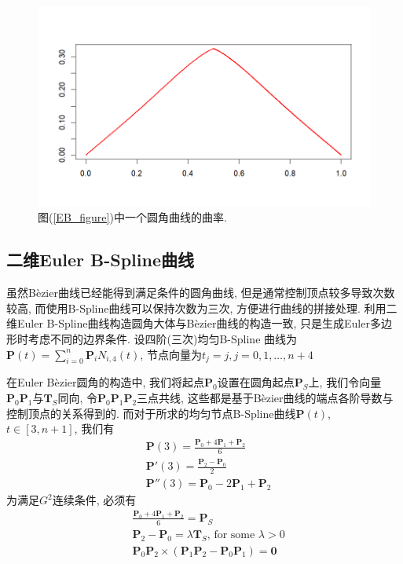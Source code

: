 \documentclass[utf8]{ctexart} %
\begin{document}
	 \begin{figure}[htbp]
	 	\centering
	 	\includegraphics[width=0.7\linewidth]{figures/SixEdges_EulerBezier.png}
	 	\caption{图(\ref{EB_figure})中一个圆角曲线的曲率. }
	 \end{figure}
	 \subsection{二维Euler B-Spline曲线}
	 虽然B\`ezier曲线已经能得到满足条件的圆角曲线, 但是通常控制顶点较多导致次数较高, 而使用B-Spline曲线可以保持次数为三次, 方便进行曲线的拼接处理. 利用二维Euler B-Spline曲线构造圆角大体与B\`{e}zier曲线的构造一致, 只是生成Euler多边形时考虑不同的边界条件.  设四阶(三次)均匀B-Spline 曲线为$\boldsymbol{P}(t)=\sum_{i=0}^n\boldsymbol{P}_iN_{i,4}(t)$, 节点向量为$t_j = j,j=0,1,\dots,n+4$ \par 
	 在Euler B\`{e}zier圆角的构造中, 我们将起点$\boldsymbol{P}_0$设置在圆角起点$\boldsymbol{P}_S$上, 我们令向量$\boldsymbol{P}_0\boldsymbol{P}_1$与$\boldsymbol{T}_S$同向, 令$\boldsymbol{P}_0$$\boldsymbol{P}_1$$\boldsymbol{P}_2$三点共线, 这些都是基于B\`{e}zier曲线的端点各阶导数与控制顶点的关系得到的. 而对于所求的均匀节点B-Spline曲线$\boldsymbol{P}(t)$, $t\in[3,n+1]$, 我们有
	 \begin{equation}
	 \begin{aligned}
	 &\boldsymbol{P}(3)=\frac{\boldsymbol{P}_0+4\boldsymbol{P}_1+\boldsymbol{P}_2}6\\
	 &\boldsymbol{P}'(3)=\frac{\boldsymbol{P}_2-\boldsymbol{P}_0}2\\
	 &\boldsymbol{P}''(3)=\boldsymbol{P}_0-2\boldsymbol{P}_1+\boldsymbol{P}_2
	 \end{aligned}
	 \end{equation}
	 为满足$G^2$连续条件, 必须有
	 \begin{equation}\label{EBS_condition}
	 \begin{aligned}
	 &\frac{\boldsymbol{P}_0+4\boldsymbol{P}_1+\boldsymbol{P}_2}6=\boldsymbol{P}_S\\
	 &\boldsymbol{P}_2-\boldsymbol{P}_0=\lambda\boldsymbol{T}_S\text{, for some }\lambda>0\\
	 &\boldsymbol{P}_0\boldsymbol{P}_2\times(\boldsymbol{P}_1\boldsymbol{P}_2-\boldsymbol{P}_0\boldsymbol{P}_1)=\boldsymbol{0}
	 \end{aligned}
	 \end{equation}
\end{document}
